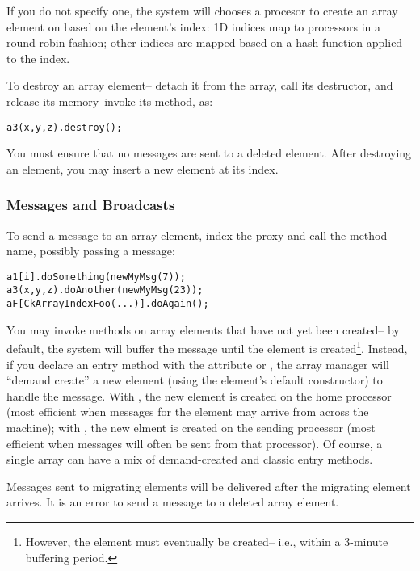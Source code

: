 If you do not specify one, the system will chooses a procesor to 
create an array element on based on the element's index: 1D indices 
map to processors in a round-robin fashion; other indices are mapped 
based on a hash function applied to the index.

To destroy an array element-- detach it from the array,
call its destructor, and release its memory--invoke its 
 method, as:

\begin{alltt}
a3(x,y,z).destroy();
\end{alltt}

You must ensure that no messages are sent to a deleted element. 
After destroying an element, you may insert a new element at
its index.

\subsubsection{Messages and Broadcasts}

To send a  message to an array element, index the proxy 
and call the method name, possibly passing a message:

\begin{alltt}
a1[i].doSomething(new MyMsg(7));
a3(x,y,z).doAnother(new MyMsg(23));
aF[CkArrayIndexFoo(...)].doAgain();
\end{alltt}

You may invoke methods on array elements that have not yet
been created-- by default, the system will buffer the message until the
element is created\footnote{However, the element must eventually be 
created-- i.e., within a 3-minute buffering period.}.
Instead, if you declare an entry method with the attribute 
 
\kw{[createhere]} or \kw{[createhome]}, the array manager will 
``demand create'' a new element (using the element's default constructor)
to handle the message.  With \kw{[createhome]}, the new element
is created on the home processor (most efficient when messages for
the element may arrive from across the machine); with \kw{[createhere]},
the new elment is created on the sending processor (most efficient
when messages will often be sent from that processor).
Of course, a single array can have a mix of demand-created and
classic entry methods.


Messages sent to migrating elements will be delivered after
the migrating element arrives.  It is an error to send 
a message to a deleted array element.

